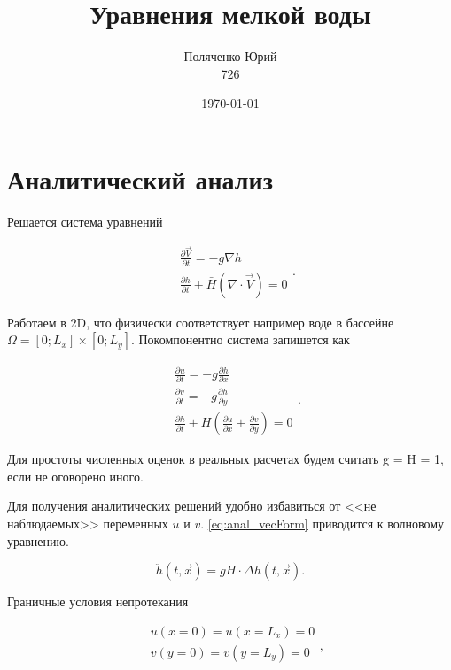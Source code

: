 \documentclass[a4paper,12pt]{article} %
\author{Поляченко Юрий \\ 726}
\title{Уравнения мелкой воды}
\date{\today}
\begin{document}

\clearpage\maketitle
\thispagestyle{empty}

\newpage

\tableofcontents

\newpage

\section{Аналитический анализ}

Решается система уравнений

\begin{equation} \label{eq:anal_vecForm}
\begin{aligned}
&\frac{\partial \vec{V}}{\partial t}=-g \nabla h\\
&\frac{\partial h}{\partial t}+\bar{H}(\nabla \cdot \vec{V})=0
\end{aligned} .
\end{equation}

Работаем в 2D, что физически соответствует например воде в бассейне $\Omega = [0; L_x] \times [0; L_y]$. Покомпонентно система запишется как

\begin{equation}
\begin{aligned}
&\frac{\partial u}{\partial t}=-g \frac{\partial h}{\partial x}\\
&\frac{\partial v}{\partial t}=-g \frac{\partial h}{\partial y}\\
&\frac{\partial h}{\partial t}+H\left(\frac{\partial u}{\partial x}+\frac{\partial v}{\partial y}\right)=0
\end{aligned}.
\end{equation}

Для простоты численных оценок в реальных расчетах будем считать g = H = 1, если не оговорено иного.

Для получения аналитических решений удобно избавиться от <<не наблюдаемых>> переменных $u$ и $v$. \eqref{eq:anal_vecForm} приводится к волновому уравнению.

\begin{equation}
\ddot{h}(t, \vec{x}) = g H \cdot \Delta h(t, \vec{x}).
\end{equation}

Граничные условия непротекания

\begin{equation}
\begin{aligned}
& u(x = 0) = u(x = L_x) = 0 \\
& v(y = 0) = v(y = L_y) = 0 \\
\end{aligned},
\end{equation}
\end{document}
